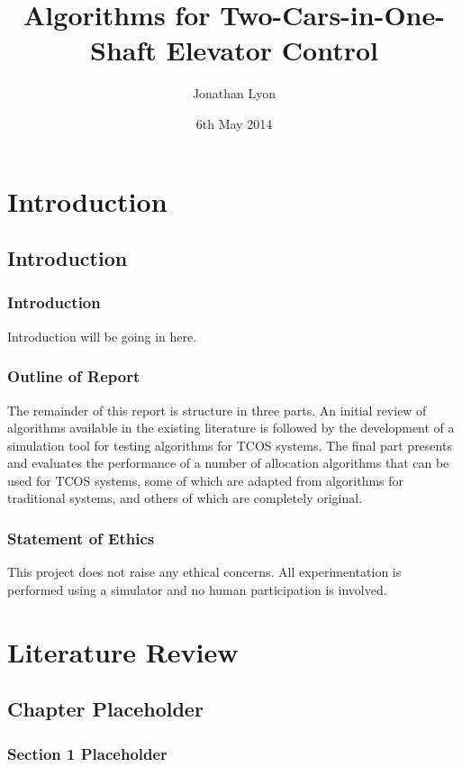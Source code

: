 \documentclass{UoYCSproject}
\author{Jonathan Lyon}
\title{Algorithms for Two-Cars-in-One-Shaft Elevator Control}
\date{6th May 2014}
\begin{document}
\maketitle 

\part{Introduction}

\chapter{Introduction}

\section{Introduction}

Introduction will be going in here.

\section{Outline of Report}

The remainder of this report is structure in three parts.  An initial review of algorithms available in the existing literature is followed by the development of a simulation tool for testing algorithms for TCOS systems.  The final part presents and evaluates the performance of a number of allocation algorithms that can be used for TCOS systems, some of which are adapted from algorithms for traditional systems, and others of which are completely original.

\section{Statement of Ethics}

This project does not raise any ethical concerns.  All experimentation is performed using a simulator and no human participation is involved.

\part{Literature Review}

\chapter{Chapter Placeholder}

\section{Section 1 Placeholder}
\end{document}
